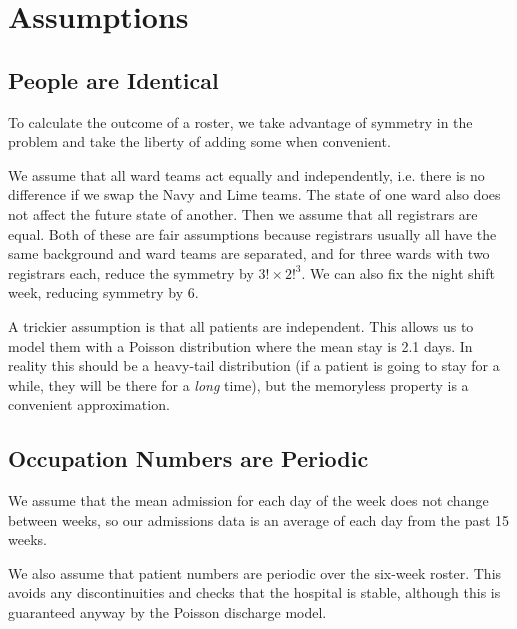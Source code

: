 \documentclass[a4paper]{article}
\begin{document}
\section{Assumptions}

\subsection{People are Identical}

To calculate the outcome of a roster, we take advantage of symmetry in the problem and take the liberty of adding some when convenient.

We assume that all ward teams act equally and independently, i.e. there is no difference if we swap the Navy and Lime teams. The state of one ward also does not affect the future state of another. Then we assume that all registrars are equal. Both of these are fair assumptions because registrars usually all have the same background and ward teams are separated, and for three wards with two registrars each, reduce the symmetry by $3!\times2!^3$. We can also fix the night shift week, reducing symmetry by 6.

A trickier assumption is that all patients are independent. This allows us to model them with a Poisson distribution where the mean stay is 2.1 days.
In reality this should be a heavy-tail distribution (if a patient is going to stay for a while, they will be there for a \emph{long} time), but the memoryless property is a convenient approximation.

\subsection{Occupation Numbers are Periodic}

We assume that the mean admission for each day of the week does not change between weeks, so our admissions data is an average of each day from the past 15 weeks.

We also assume that patient numbers are periodic over the six-week roster. This avoids any discontinuities and checks that the hospital is stable, although this is guaranteed anyway by the Poisson discharge model.
\end{document}

